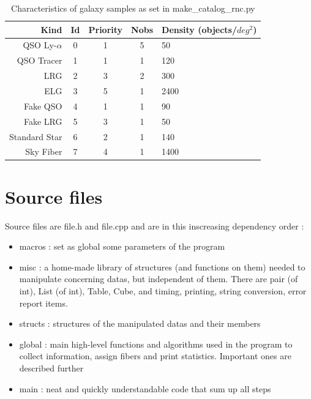 \documentclass{extarticle}
\def\sqd{$deg^{2}$}
\begin{document}
\begin{table}[H]\centering
	\begin{tabular}{rcccl} \hline
		Kind&Id&Priority&Nobs&Density (objects/\sqd)\\ \hline
		QSO Ly-$\alpha$& 0 & 1 & 5 &  50\\
		QSO Tracer & 1 & 1 & 1& 120\\
		LRG & 2 & 3 &2 & 300\\
		ELG & 3 & 5 & 1 & 2400\\
		Fake QSO & 4 & 1 & 1& 90\\
		Fake LRG & 5 & 3 & 1 & 50\\
		Standard Star & 6 & 2 & 1&  140\\
		Sky Fiber & 7 & 4 & 1& 1400\\ \hline
	\end{tabular}
	\caption{Characteristics of galaxy samples as set in make\_catalog\_rnc.py}\label{table:characteristics}
\end{table}


\section{Source files}
Source files are file.h and file.cpp and are in this inscreasing dependency order :
\begin{itemize} 
	\item macros : set as global some parameters of the program
	\item misc : a home-made library of structures (and functions on them) needed to manipulate concerning datas, but independent of them. There are pair (of int), List (of int), Table, Cube, and timing, printing, string conversion, error report items.
	\item structs : structures of the manipulated datas and their members
	\item global : main high-level functions and algorithms used in the program to collect information, assign fibers and print statistics. Important ones are described further
	\item main : neat and quickly understandable code that sum up all steps
\end{itemize} 
\end{document}
